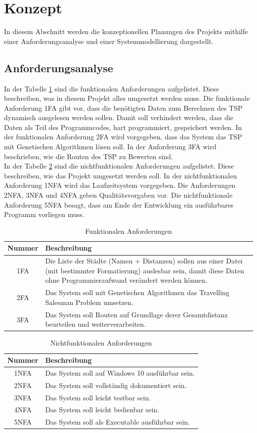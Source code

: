 \section{Konzept}
In diesem Abschnitt werden die konzeptionellen Planungen des Projekts mithilfe einer Anforderungsanalyse und einer Systemmodellierung dargestellt.

\subsection{Anforderungsanalyse}
In der Tabelle \ref{tab:fa} sind die funktionalen Anforderungen aufgelistet. Diese beschreiben, was in diesem Projekt alles umgesetzt werden muss. Die funktionale Anforderung 1FA gibt vor, dass die benötigten Daten zum Berechnen des TSP dynamisch ausgelesen werden sollen. Damit soll verhindert werden, dass die Daten als Teil des Programmcodes, hart programmiert, gespeichert werden.
In der funktionalen Anforderung 2FA wird vorgegeben, dass das System das TSP mit Genetischen Algorithmen lösen soll. In der Anforderung 3FA wird beschrieben, wie die Routen des TSP zu Bewerten sind.\\
In der Tabelle \ref{tab:nfa} sind die nichtfunktionalen Anforderungen aufgelistet. Diese beschreiben, wie das Projekt umgesetzt werden soll. In der nichtfunktionalen Anforderung 1NFA wird das Laufzeitsystem vorgegeben. Die Anforderungen 2NFA, 3NFA und 4NFA geben Qualitätsvorgaben vor. Die nichtfunktionale Anforderung 5NFA besagt, dass am Ende der Entwicklung ein ausführbares Programm vorliegen muss.

\begin{table}[H]
\caption{Funktionalen Anforderungen}
\begin{tabular}{|c|p{12.5cm}|}
Nummer & Beschreibung \\
\hline
1FA & Die Liste der Städte (Namen + Distanzen) sollen aus einer Datei (mit bestimmter Formatierung) auslesbar sein, damit diese Daten ohne Programmieraufwand verändert werden können. \\  
2FA & Das System soll mit Genetischen Algorithmen das Travelling Salesman Problem umsetzen. \\  
3FA & Das System soll Routen auf Grundlage derer Gesamtdistanz beurteilen und weiterverarbeiten. \\  
\end{tabular}
\label{tab:fa}
\end{table}
\begin{table}[H]
\caption{Nichtfunktionalen Anforderungen}
\begin{tabular}{|c|p{12.5cm}|}
 Nummer & Beschreibung \\ 
\hline
1NFA & Das System soll auf Windows 10 ausführbar sein.\\
2NFA & Das System soll vollständig dokumentiert sein.\\
3NFA & Das System soll leicht testbar sein.\\
4NFA & Das System soll leicht bedienbar sein.\\
5NFA & Das System soll als Executable ausführbar sein.\\
\end{tabular}
\label{tab:nfa}
\end{table}

